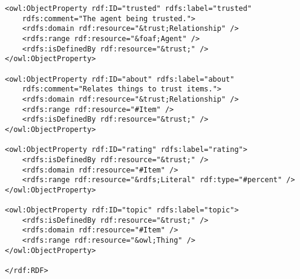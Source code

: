\begin{verbatim}
<owl:ObjectProperty rdf:ID="trusted" rdfs:label="trusted"
    rdfs:comment="The agent being trusted.">
    <rdfs:domain rdf:resource="&trust;Relationship" />
    <rdfs:range rdf:resource="&foaf;Agent" />
    <rdfs:isDefinedBy rdf:resource="&trust;" />
</owl:ObjectProperty>

<owl:ObjectProperty rdf:ID="about" rdfs:label="about" 
    rdfs:comment="Relates things to trust items.">
    <rdfs:domain rdf:resource="&trust;Relationship" />
    <rdfs:range rdf:resource="#Item" />
    <rdfs:isDefinedBy rdf:resource="&trust;" />
</owl:ObjectProperty>

<owl:ObjectProperty rdf:ID="rating" rdfs:label="rating">
    <rdfs:isDefinedBy rdf:resource="&trust;" />
    <rdfs:domain rdf:resource="#Item" />
    <rdfs:range rdf:resource="&rdfs;Literal" rdf:type="#percent" />
</owl:ObjectProperty>

<owl:ObjectProperty rdf:ID="topic" rdfs:label="topic">
    <rdfs:isDefinedBy rdf:resource="&trust;" />
    <rdfs:domain rdf:resource="#Item" />
    <rdfs:range rdf:resource="&owl;Thing" />
</owl:ObjectProperty>

</rdf:RDF>
\end{verbatim}
